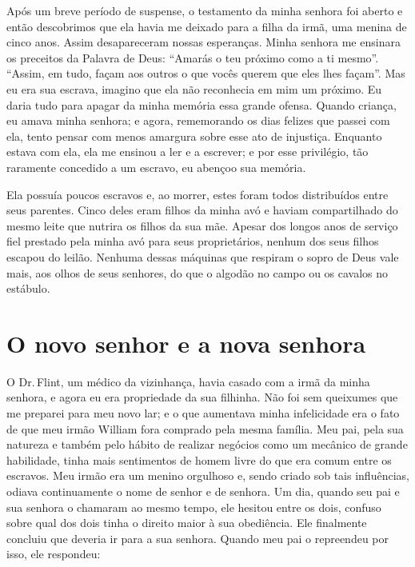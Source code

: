 Após um breve período de suspense, o
testamento da minha senhora foi aberto e então descobrimos que ela havia
me deixado para a filha da irmã, uma menina de cinco anos. Assim
desapareceram nossas esperanças. Minha senhora me ensinara os preceitos
da Palavra de Deus: ``Amarás o teu próximo como a ti mesmo''. ``Assim,
em tudo, façam aos outros o que vocês querem que eles lhes façam''. Mas
eu era sua escrava, imagino que ela não reconhecia em mim um próximo. Eu
daria tudo para apagar da minha memória essa grande ofensa. Quando
criança, eu amava minha senhora; e agora, rememorando os dias felizes
que passei com ela, tento pensar com menos amargura sobre esse ato de
injustiça. Enquanto estava com ela, ela me ensinou a ler e a escrever; e
por esse privilégio, tão raramente concedido a um escravo, eu abençoo
sua memória.

Ela
possuía poucos escravos e, ao morrer, estes foram todos distribuídos
entre seus parentes. Cinco deles eram filhos da minha avó e haviam
compartilhado do mesmo leite que nutrira os filhos da sua mãe. Apesar
dos longos anos de serviço fiel prestado pela minha avó para seus
proprietários, nenhum dos seus filhos escapou do leilão. Nenhuma dessas
máquinas que respiram o sopro de Deus vale mais, aos olhos de seus
senhores, do que o algodão no campo ou os cavalos no estábulo.

\chapter*{O novo senhor e a nova senhora}

O Dr.\,Flint, um médico da vizinhança,
havia casado com a irmã da minha senhora, e agora eu era propriedade da
sua filhinha. Não foi sem queixumes que me preparei para meu novo lar; e
o que aumentava minha infelicidade era o fato de que meu irmão William
fora comprado pela mesma família. Meu pai, pela sua natureza e também
pelo hábito de realizar negócios como um mecânico de grande habilidade,
tinha mais sentimentos de homem livre do que era comum entre os
escravos. Meu irmão era um menino orgulhoso e, sendo criado sob tais
influências, odiava continuamente o nome de senhor e de senhora. Um dia,
quando seu pai e sua senhora o chamaram ao mesmo tempo, ele hesitou
entre os dois, confuso sobre qual dos dois tinha o direito maior à sua
obediência. Ele finalmente concluiu que deveria ir para a sua senhora.
Quando meu pai o repreendeu por isso, ele respondeu:

